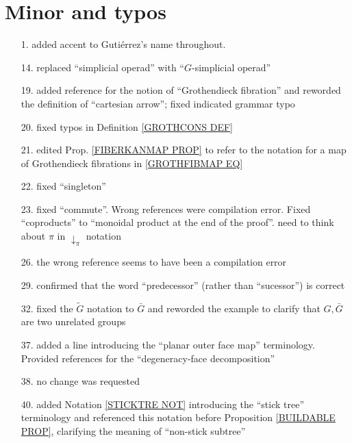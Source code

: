 \documentclass{article}
\begin{document}
\section{Minor and typos} 


\begin{itemize}
\item[1.] added accent to Guti\'{e}rrez's name throughout.

\item[14.] replaced ``simplicial operad'' with  ``$G$-simplicial operad''

\item[19.] added reference for the notion of ``Grothendieck fibration'' and reworded the definition of ``cartesian arrow''; fixed indicated grammar typo

\item[20.] fixed typos in Definition \ref{GROTHCONS DEF}

\item[21.] edited Prop. \ref{FIBERKANMAP PROP} to refer to the notation for a map of Grothendieck fibrations in \eqref{GROTHFIBMAP EQ}

\item[22.] fixed ``singleton''

\item[23.] fixed ``commute''. Wrong references were compilation error.
Fixed ``coproducts'' to ``monoidal product at the end of the proof''. {\color{red} need to think about $\pi$ in $\downarrow_{\pi}$ notation}

\item[26.] the wrong reference seems to have been a compilation error

\item[29.] confirmed that the word ``predecessor'' (rather than ``sucessor'') is correct

\item[32.] fixed the $\tilde{G}$ notation to $\bar{G}$ and reworded the example to clarify that $G,\bar{G}$ are two unrelated groups

\item[37.] added a line introducing the ``planar outer face map'' terminology. Provided references for the ``degeneracy-face decomposition'' 

\item[38.] no change was requested

\item[40.] added Notation \ref{STICKTRE NOT} introducing the ``stick tree'' terminology and referenced this notation before
Proposition \ref{BUILDABLE PROP},
clarifying the meaning of ``non-stick subtree''


\end{itemize}
\end{document}
